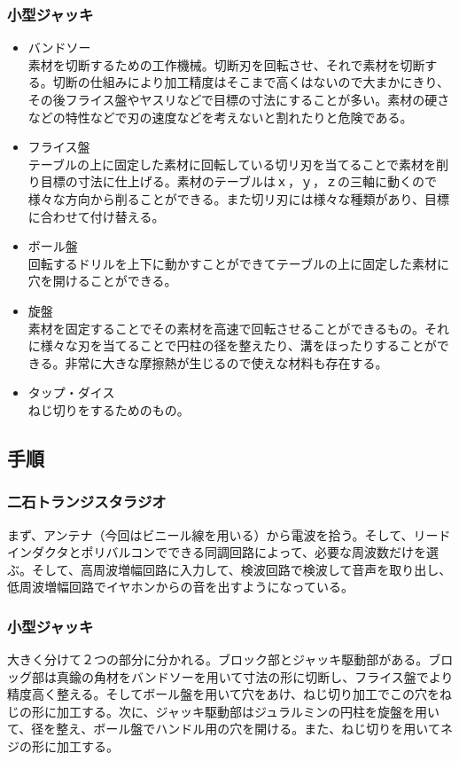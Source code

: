 \documentclass{jsarticle}
\begin{document}
\subsubsection{小型ジャッキ}
\begin{itemize}
\item バンドソー\\
素材を切断するための工作機械。切断刃を回転させ、それで素材を切断する。切断の仕組みにより加工精度はそこまで高くはないので大まかにきり、その後フライス盤やヤスリなどで目標の寸法にすることが多い。素材の硬さなどの特性などで刃の速度などを考えないと割れたりと危険である。
\item フライス盤\\
テーブルの上に固定した素材に回転している切リ刃を当てることで素材を削り目標の寸法に仕上げる。素材のテーブルはｘ，ｙ，ｚの三軸に動くので様々な方向から削ることができる。また切リ刃には様々な種類があり、目標に合わせて付け替える。
\item ボール盤\\
回転するドリルを上下に動かすことができてテーブルの上に固定した素材に穴を開けることができる。
\item 旋盤\\
素材を固定することでその素材を高速で回転させることができるもの。それに様々な刃を当てることで円柱の径を整えたり、溝をほったりすることができる。非常に大きな摩擦熱が生じるので使えな材料も存在する。
\item タップ・ダイス\\
ねじ切りをするためのもの。
\end{itemize}
\subsection{手順}
\subsubsection{二石トランジスタラジオ}
まず、アンテナ（今回はビニール線を用いる）から電波を拾う。そして、リードインダクタとポリバルコンでできる同調回路によって、必要な周波数だけを選ぶ。そして、高周波増幅回路に入力して、検波回路で検波して音声を取り出し、低周波増幅回路でイヤホンからの音を出すようになっている。
\subsubsection{小型ジャッキ}
大きく分けて２つの部分に分かれる。ブロック部とジャッキ駆動部がある。ブロッグ部は真鍮の角材をバンドソーを用いて寸法の形に切断し、フライス盤でより精度高く整える。そしてボール盤を用いて穴をあけ、ねじ切り加工でこの穴をねじの形に加工する。次に、ジャッキ駆動部はジュラルミンの円柱を旋盤を用いて、径を整え、ボール盤でハンドル用の穴を開ける。また、ねじ切りを用いてネジの形に加工する。
\end{document}
